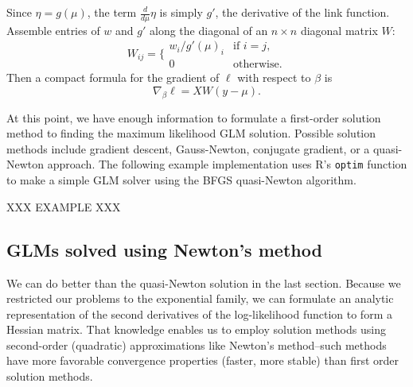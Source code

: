 \documentclass[10pt]{article} %
\begin{document}
Since $\eta=g(\mu)$, the term $\frac{d}{d\mu}\eta$ is
simply $g'$, the derivative of the link function.
Assemble entries of $w$ and $g'$ along the diagonal of an
$n\times n$ diagonal matrix $W$:
\begin{equation}\label{W}
W_{ij} = \bigg\{\begin{array}{cr}
w_i / g'(\mu)_i & \mbox{if $i=j$}, \\
0 & \mbox{otherwise}.
\end{array}
\end{equation}
Then a compact formula for the gradient of $\ell$ with respect to $\beta$ is
\begin{equation}\label{gradient}
\nabla_\beta\ell = XW(y - \mu).
\end{equation}

At this point, we have enough information to formulate a first-order solution
method to finding the maximum likelihood GLM solution.  Possible solution
methods include gradient descent, Gauss-Newton, conjugate gradient, or
a quasi-Newton approach. The following example implementation uses R's
\verb+optim+ function to make a simple GLM solver using the BFGS quasi-Newton
algorithm.

XXX EXAMPLE XXX



\subsection*{GLMs solved using Newton's method}

We can do better than the quasi-Newton solution in the last section.  Because
we restricted our problems to the exponential family, we can formulate an
analytic representation of the second derivatives of the log-likelihood
function to form a Hessian matrix. That knowledge enables us to employ solution
methods using second-order (quadratic) approximations like Newton's
method--such methods have more favorable convergence properties (faster, more
stable) than first order solution methods.
\end{document}
